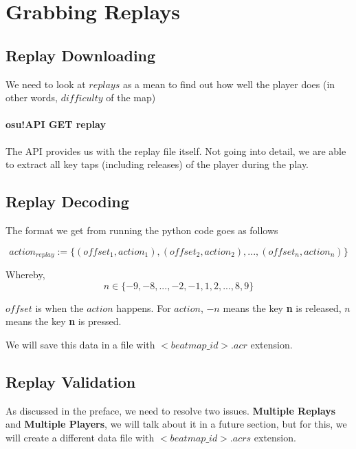 

\section{Grabbing Replays}

\subsection{Replay Downloading}

We need to look at $replays$ as a mean to find out how well the player does (in other words, $difficulty$ of the map)

\paragraph{osu!API GET replay} The API provides us with the replay file itself. Not going into detail, we are able to extract all key taps (including releases) of the player during the play.

\subsection{Replay Decoding}

The format we get from running the python code goes as follows

$$ action_{replay} := \lbrace(offset_1, action_1), (offset_2, action_2), ... , (offset_n, action_n)\rbrace $$

Whereby, 
$$n \in \lbrace-9, -8, ... , -2, -1, 1, 2, ... , 8, 9\rbrace$$

$offset$ is when the $action$ happens. For $action$, $-n$ means the key \textbf{n} is released, $n$ means the key \textbf{n} is pressed.

We will save this data in a file with $<beatmap\_id>.acr$ extension.

\subsection{Replay Validation}

As discussed in the preface, we need to resolve two issues. \textbf{Multiple Replays} and \textbf{Multiple Players}, we will talk about it in a future section, but for this, we will create a different data file with $<beatmap\_id>.acrs$ extension.


